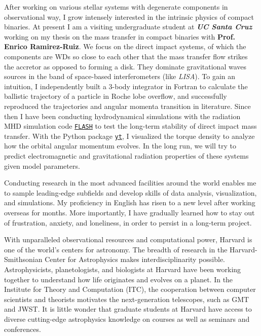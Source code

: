 \documentclass[11pt, a4paper]{awesome-cv} %
\begin{document}
\begin{cvletter}
After working on various stellar systems with degenerate components in observational way, I grow intensely interested in the intrinsic physics of compact binaries. At present I am a visiting undergraduate student at \textbf{\textit{UC Santa Cruz}} working on my thesis on the mass transfer in compact binaries with \textbf{Prof. Enrico Ramirez-Ruiz}. We focus on the direct impact systems, of which the components are WDs so close to each other that the mass transfer flow strikes the accretor as opposed to forming a disk. They dominate gravitational waves sources in the band of space-based interferometers (like \textit{LISA}). To gain an intuition, I independently built a 3-body integrator in Fortran to calculate the ballistic trajectory of a particle in Roche lobe overflow, and successfully reproduced the trajectories and angular momenta transition in literature. Since then I have been conducting hydrodynamical simulations with the radiation MHD simulation code \href{http://flash.uchicago.edu/site/}{\texttt{FLASH}} to test the long-term stability of direct impact mass transfer. With the Python package \href{https://yt-project.org}{\texttt{yt}}, I visualized the torque density to analyze how the orbital angular momentum evolves. In the long run, we will try to predict electromagnetic and gravitational radiation properties of these systems given model parameters.

Conducting research in the most advanced facilities around the world enables me to sample leading-edge subfields and develop skills of data analysis, visualization, and simulations. My proficiency in English has risen to a new level after working overseas for months. More importantly, I have gradually learned how to stay out of frustration, anxiety, and loneliness, in order to persist in a long-term project.


With unparalleled observational resources and computational power, Harvard is one of the world’s centers for astronomy. The breadth of research in the Harvard-Smithsonian Center for Astrophysics makes interdisciplinarity possible. Astrophysicists, planetologists, and biologists at Harvard have been working together to understand how life originates and evolves on a planet. In the Institute for Theory and Computation (ITC), the cooperation between computer scientists and theorists motivates the next-generation telescopes, such as GMT and JWST. It is little wonder that graduate students at Harvard have access to diverse cutting-edge astrophysics knowledge on courses as well as seminars and conferences. 


\end{cvletter}
\end{document}
